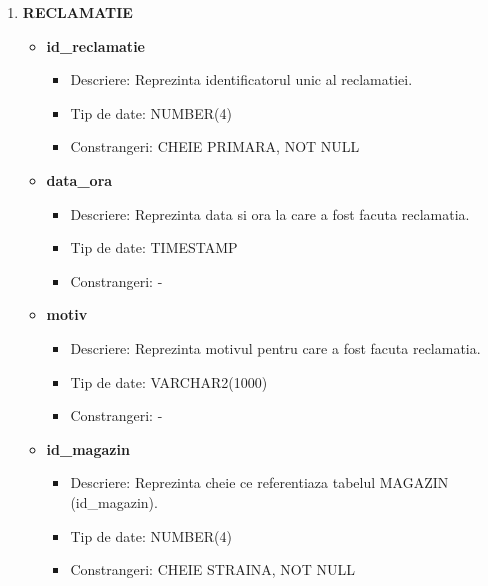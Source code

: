 \begin{enumerate}
\begin{itemize}
    \end{itemize}

    \vspace{0.5cm}

    \item \textbf{RECLAMATIE}
    \begin{itemize}
    
        \item \textbf{id\_reclamatie}
                \begin{itemize}
                    \item Descriere: Reprezinta identificatorul unic al reclamatiei.
                    \item Tip de date: NUMBER(4)
                    \item Constrangeri: CHEIE PRIMARA, NOT NULL
                \end{itemize}

        \item \textbf{data\_ora}
                \begin{itemize}
                    \item Descriere: Reprezinta data si ora la care a fost facuta reclamatia.
                    \item Tip de date: TIMESTAMP
                    \item Constrangeri: -
                \end{itemize}

        \item \textbf{motiv}
                \begin{itemize}
                    \item Descriere: Reprezinta motivul pentru care a fost facuta reclamatia.
                    \item Tip de date: VARCHAR2(1000)
                    \item Constrangeri: -
                \end{itemize}
                
       \item \textbf{id\_magazin}
                \begin{itemize}
                    \item Descriere: Reprezinta cheie ce referentiaza tabelul MAGAZIN (id\_magazin).
                    \item Tip de date: NUMBER(4)
                    \item Constrangeri: CHEIE STRAINA, NOT NULL
                \end{itemize}


\end{itemize}
\end{enumerate}
